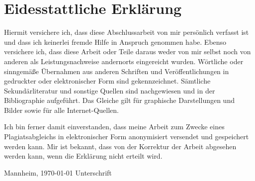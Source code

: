 \chapter*{Eidesstattliche Erkl\"{a}rung}
\thispagestyle{empty}
Hiermit versichere ich, dass diese Abschlussarbeit von mir persönlich verfasst
ist und dass ich keinerlei fremde Hilfe in Anspruch genommen habe. Ebenso
versichere ich, dass diese Arbeit oder Teile daraus weder von mir selbst noch
von anderen als Leistungsnachweise andernorts eingereicht wurden. Wörtliche oder
sinn\-gemäße Übernahmen aus anderen Schriften und Veröffentlichungen in gedruckter
oder elektronischer Form sind gekennzeichnet. Sämtliche Sekundärliteratur und
sonstige Quellen sind nachgewiesen und in der Bibliographie aufgeführt. Das
Glei\-che gilt für graphische Darstellungen und Bilder sowie für alle
Internet-Quellen.

Ich bin ferner damit einverstanden, dass meine Arbeit zum Zwecke eines
Plagiatsabgleichs in elektronischer Form anonymisiert versendet und gespeichert
werden kann. Mir ist bekannt, dass von der Korrektur der Arbeit abgesehen werden
kann, wenn die Erklärung nicht erteilt wird.
\bigskip

\vspace{2.5cm}

Mannheim, \today \hspace{7cm} Unterschrift\\